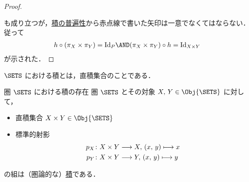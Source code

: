 \documentclass[geometry_main]{subfiles}
\begin{document}
\begin{proof}
\begin{center}
	\end{center}
	も成り立つが，\hyperref[def:product]{積の普遍性}から赤点線で書いた矢印は一意でなくてはならない．従って
	\begin{align}
		h \circ (\pi_X \times \pi_Y) = \mathrm{Id}_{P} \AND (\pi_X \times \pi_Y) \circ h = \mathrm{Id}_{X \times Y}
	\end{align}
	が示された．
\end{proof}

$\SETS$ における積とは，直積集合のことである．
\begin{myprop}[label=prop:product-sets, breakable]{圏 $\SETS$ における積の存在}
	圏 $\SETS$ とその対象 $X,\, Y \in \Obj{\SETS}$ に対して，
	\begin{itemize}
		\item 直積集合 $X \times Y \in \Obj{\SETS}$
		\item 標準的射影
		\begin{align}
			p_X &\colon X \times Y \longrightarrow X,\, (x,\, y) \longmapsto x \\
			p_Y &\colon X \times Y \longrightarrow Y,\, (x,\, y) \longmapsto y
		\end{align}
	\end{itemize}
	の組は（圏論的な）\hyperref[def:product]{積}である．
\end{myprop}
\end{document}
